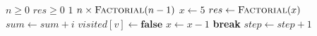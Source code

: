 \documentclass{article}
\begin{document}
\begin{algorithm}
\caption{Comprehensive Pseudocode Constructs}\label{alg:constructs}
\begin{algorithmic}[1]
\Require $n \ge 0$
\Ensure $res \ge 0$
    \State \Return $1$
  \Else
    \State \Return $n \times \Call{Factorial}{n - 1}$
  \EndIf
\EndFunction
\Statex
{}
  \State $x \gets 5$
  \State $res \gets \Call{Factorial}{x}$ 
    \State $sum \gets sum + i$
  \EndFor
    \State $visited[v] \gets \textbf{false}$
  \EndFor
  \Loop
    \State $x \gets x - 1$
      \State \textbf{break}
    \EndIf
  \EndLoop
  \Repeat
    \State $step \gets step + 1$
\EndProcedure
\end{algorithmic}
\end{algorithm}
\end{document}

